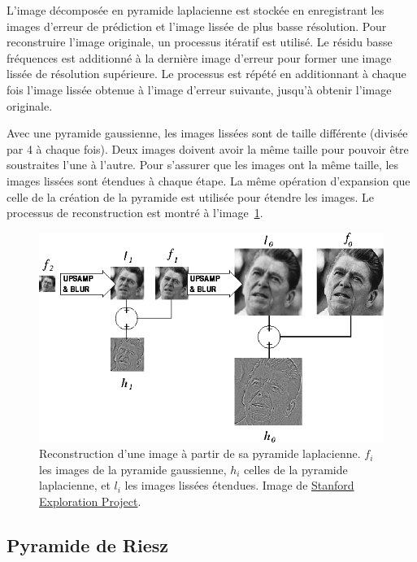 L'image décomposée en pyramide laplacienne est stockée en enregistrant les images d'erreur de prédiction et l'image lissée de plus basse résolution. Pour reconstruire l'image originale, un processus itératif est utilisé. Le résidu basse fréquences est additionné à la dernière image d'erreur pour former une image lissée de résolution supérieure. Le processus est répété en additionnant à chaque fois l'image lissée obtenue à l'image d'erreur suivante, jusqu'à obtenir l'image originale.

\bigskip

Avec une pyramide gaussienne, les images lissées sont de taille différente (divisée par 4 à chaque fois). Deux images doivent avoir la même taille pour pouvoir être soustraites l'une à l'autre. Pour s'assurer que les images ont la même taille, les images lissées sont étendues à chaque étape. La même opération d'expansion que celle de la création de la pyramide est utilisée pour étendre les images. Le processus de reconstruction est montré à l'image~\ref{fig:laplace-reconstruction}.

\begin{figure}
    \centering
    \includegraphics[width=.85\textwidth]{contenu/resources/images/laplacian_pyramid_reconstruction}
    \caption[Reconstruction d'une image à partir de sa pyramide laplacienne]{Reconstruction d'une image à partir de sa pyramide laplacienne. $f_i$ les images de la pyramide gaussienne, $h_i$ celles de la pyramide laplacienne, et $l_i$ les images lissées étendues. Image de \href{https://web.archive.org/web/20230203082428/http://sepwww.stanford.edu/data/media/public/sep/morgan/texturematch/paper_html/node3.html}{Stanford Exploration Project}.}
    \label{fig:laplace-reconstruction}
\end{figure}

\subsection{Pyramide de Riesz}

